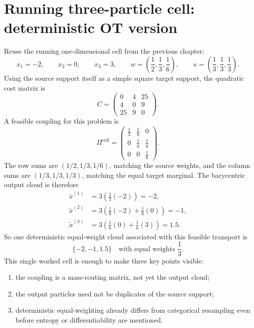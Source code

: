 \section{Running three-particle cell: deterministic OT version}
\label{sec:bf-ot-baseline-cell}

Reuse the running one-dimensional cell from the previous chapter:
\[
  x_1=-2,
  \qquad x_2=0,
  \qquad x_3=3,
  \qquad
  w=
  \left(
    \frac{1}{2},
    \frac{1}{3},
    \frac{1}{6}
  \right),
  \qquad
  u=
  \left(
    \frac{1}{3},
    \frac{1}{3},
    \frac{1}{3}
  \right).
\]
Using the source support itself as a simple square target support, the quadratic
cost matrix is
\begin{equation}
\label{eq:bf-ot-baseline-cost}
  C
  =
  \begin{pmatrix}
    0 & 4 & 25 \\
    4 & 0 & 9 \\
    25 & 9 & 0
  \end{pmatrix}.
\end{equation}
A feasible coupling for this problem is
\begin{equation}
\label{eq:bf-ot-baseline-feasible-coupling}
  \Pi^{\mathrm{cell}}
  =
  \begin{pmatrix}
    \frac{1}{3} & \frac{1}{6} & 0 \\
    0 & \frac{1}{6} & \frac{1}{6} \\
    0 & 0 & \frac{1}{6}
  \end{pmatrix}.
\end{equation}
The row sums are
\((1/2,1/3,1/6)\), matching the source weights, and the column sums are
\((1/3,1/3,1/3)\), matching the equal target marginal.  The barycentric output
cloud is therefore
\begin{align}
\label{eq:bf-ot-baseline-cell-barycentric}
  \tilde x^{(1)} &= 3\left(\frac{1}{3}(-2)\right) = -2, \\
  \tilde x^{(2)} &= 3\left(\frac{1}{6}(-2)+\frac{1}{6}(0)\right) = -1, \\
  \tilde x^{(3)} &= 3\left(\frac{1}{6}(0)+\frac{1}{6}(3)\right) = 1.5.
\end{align}
So one deterministic equal-weight cloud associated with this feasible transport is
\[
  \{-2,-1,1.5\}
  \quad\text{with equal weights }\frac{1}{3}.
\]
This single worked cell is enough to make three key points visible:
\begin{enumerate}[label=(\roman*)]
  \item the coupling is a mass-routing matrix, not yet the output cloud;
  \item the output particles need not be duplicates of the source support;
  \item deterministic equal-weighting already differs from categorical resampling
  even before entropy or differentiability are mentioned.
\end{enumerate}

